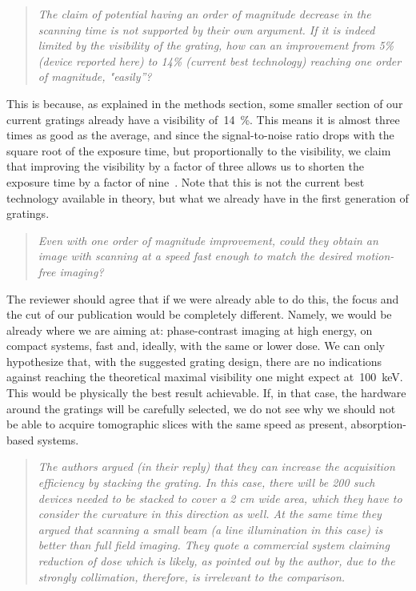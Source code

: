 \documentclass[a4paper,english]{scrartcl}
\newenvironment{reviewerquote}{\begin{quote}\itshape}{\end{quote}}
\begin{document}
\begin{reviewerquote}
The claim of potential having an order of magnitude decrease in
the scanning time is not supported by their own argument. If it is indeed
limited by the visibility of the grating, how can an improvement from 5\%
(device reported here) to 14\% (current best technology) reaching one order
of magnitude, "easily”? 
\end{reviewerquote}

This is because, as explained in the methods section, some
smaller section of our current gratings already have a visibility
of~\SI{14}{\percent}. 
This means it is almost three times as good as the average, and since the
signal-to-noise ratio drops with the square root of the exposure time, but
proportionally to the visibility, we claim that improving the visibility by
a factor of three allows us to shorten the exposure time by a factor of
nine~\cite{Raupach2011}.
Note that this is not the current best technology
available in theory, but what we already have in the first generation of
gratings.              

\begin{reviewerquote}
Even with one order of magnitude improvement, could they obtain
an image with scanning at a speed fast enough to match the desired
motion-free imaging?
\end{reviewerquote}

The reviewer should agree that if we were already able to do
this, the focus and the cut of our publication would be completely
different. Namely, we would be already where we are aiming at:
phase-contrast imaging at high energy, on compact systems, fast and,
ideally, with the 
same or lower dose. We can only hypothesize that, with the suggested grating
design, there are no indications against reaching the theoretical maximal
visibility one might expect at~\SI{100}{\kilo\eV}. This would be physically the best
result achievable. If, in that case, the hardware around the gratings will
be carefully selected, we do not see why we should not be able to acquire
tomographic slices with the same speed as present, absorption-based systems.

\begin{reviewerquote}
The authors argued (in their reply) that they can increase the
acquisition efficiency by stacking the grating. In this case, there will be
200 such devices needed to be stacked to cover a 2 cm wide area, which they
have to consider the curvature in this direction as well. At the same time
they argued that scanning a small beam (a line illumination in this case) is
better than full field imaging. They quote a commercial system claiming
reduction of dose which is likely, as pointed out by the author, due to the
strongly collimation, therefore, is irrelevant to the comparison.
\end{reviewerquote}
\end{document}
